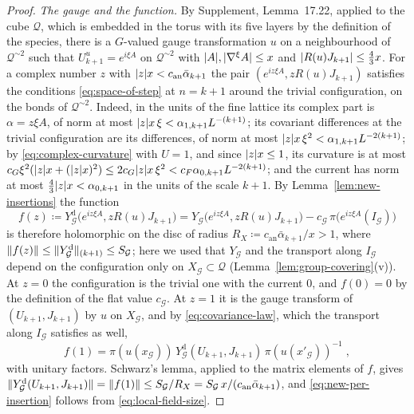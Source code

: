 \documentclass[11pt]{preprint}
\DeclarePairedDelimiter{\abs}{\lvert}{\rvert}
\DeclarePairedDelimiter{\norm}{\lVert}{\rVert}
\numberwithin{equation}{section}
\theoremstyle{definition}
\theoremstyle{remark}
\theoremstyle{plain}
\begin{document}
\begin{proof}
\emph{The gauge and the function.} By Supplement, Lemma~17.22, applied to the cube $\mathcal Q$, which is embedded in the torus with its five layers by the definition of the species, there is a $G$-valued gauge transformation $u$ on a neighbourhood of $\mathcal Q^{\sim 2}$ such that $U^u_{k+1} = e^{i\xi A}$ on $\mathcal Q^{\sim 2}$ with $\abs A, \abs{\nabla^\xi A} \leq x$ and $\abs{R(u)J_{k+1}} \leq \frac43x$. For a complex number $z$ with $\abs zx < c_{\mathrm{an}}\bar\alpha_{k+1}$ the pair $(e^{iz\xi A}, zR(u)J_{k+1})$ satisfies the conditions \eqref{eq:space-of-step} at $n = k + 1$ around the trivial configuration, on the bonds of $\mathcal Q^{\sim 2}$. Indeed, in the units of the fine lattice its complex part is $\alpha = z\xi A$, of norm at most $\abs zx\,\xi < \alpha_{1,k+1}L^{-(k+1)}$; its covariant differences at the trivial configuration are its differences, of norm at most $\abs zx\,\xi^2 < \alpha_{1,k+1}L^{-2(k+1)}$; by \eqref{eq:complex-curvature} with $U = 1$, and since $\abs zx \leq 1$, its curvature is at most $c_G\xi^2(\abs zx + (\abs zx)^2) \leq 2c_G\abs zx\,\xi^2 < c_F\alpha_{0,k+1}L^{-2(k+1)}$; and the current has norm at most $\frac43\abs zx < \alpha_{0,k+1}$ in the units of the scale $k + 1$. By Lemma~\ref{lem:new-insertions} the function
\[
    f(z) \coloneqq Y^{\mathrm d}_{\mathcal G}\bigl(e^{iz\xi A}, zR(u)J_{k+1}\bigr) = Y_{\mathcal G}\bigl(e^{iz\xi A}, zR(u)J_{k+1}\bigr) - c_{\mathcal G}\,\pi\bigl(e^{iz\xi A}(I_{\mathcal G})\bigr)
\]
is therefore holomorphic on the disc of radius $R_X \coloneqq c_{\mathrm{an}}\bar\alpha_{k+1}/x > 1$, where $\norm{f(z)} \leq \norm{Y^{\mathrm d}_{\mathcal G}}_{(k+1)} \leq S_{\mathcal G}$; here we used that $Y_{\mathcal G}$ and the transport along $I_{\mathcal G}$ depend on the configuration only on $X_{\mathcal G} \subset \mathcal Q$ (Lemma~\ref{lem:group-covering}(v)). At $z = 0$ the configuration is the trivial one with the current $0$, and $f(0) = 0$ by the definition of the flat value $c_{\mathcal G}$. At $z = 1$ it is the gauge transform of $(U_{k+1}, J_{k+1})$ by $u$ on $X_{\mathcal G}$, and by \eqref{eq:covariance-law}, which the transport along $I_{\mathcal G}$ satisfies as well,
\[
    f(1) = \pi(u(x_{\mathcal G}))\,Y^{\mathrm d}_{\mathcal G}(U_{k+1}, J_{k+1})\,\pi(u(x'_{\mathcal G}))^{-1}\;,
\]
with unitary factors. Schwarz's lemma, applied to the matrix elements of $f$, gives $\norm{Y^{\mathrm d}_{\mathcal G}(U_{k+1}, J_{k+1})} = \norm{f(1)} \leq S_{\mathcal G}/R_X = S_{\mathcal G}\,x/(c_{\mathrm{an}}\bar\alpha_{k+1})$, and \eqref{eq:new-per-insertion} follows from \eqref{eq:local-field-size}.


\end{proof}
\end{document}
